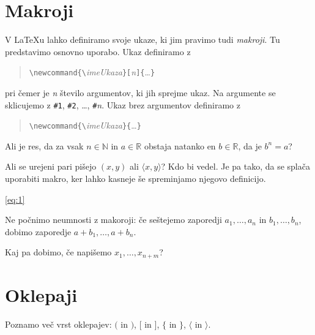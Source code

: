 \documentclass{amsart}
\begin{document}
\section{Makroji}
\label{sec:makroji}

V {\LaTeX}u lahko definiramo svoje ukaze, ki jim pravimo tudi \emph{makroji}. Tu
predstavimo osnovno uporabo. Ukaz definiramo z
%
\begin{quote}
  \verb|\newcommand{\|\emph{imeUkaza}\verb|}[|\emph{n}\verb|]{|\dots\verb|}|
\end{quote}
%
pri čemer je \emph{n} število argumentov, ki jih sprejme ukaz. Na argumente se sklicujemo
z \verb|#1|, \verb|#2|, \dots, \verb|#|\emph{n}. Ukaz brez argumentov definiramo z
%
\begin{quote}
  \verb|\newcommand{\|\emph{imeUkaza}\verb|}{|\dots\verb|}|
\end{quote}
%


\newcommand{\RR}{\mathbb{R}} %
\newcommand{\NN}{\mathbb{N}} %

Ali je res, da za vsak $n \in \NN$ in $a \in \RR$ obstaja natanko en $b \in \RR$, da je $b^n = a$?

\newcommand{\pair}[1]{\langle #1 \rangle}

Ali se urejeni pari pišejo $(x, y)$ ali $\pair{x, y}$? Kdo bi vedel. Je pa tako, da se
splača uporabiti makro, ker lahko kasneje še spreminjamo njegovo definicijo.

\newcommand{\zap}[2]{#1_1, \ldots, #1_{#2}} \ref{eq:1}

Ne počnimo neumnosti z makoroji: če seštejemo zaporedji $\zap{a}{n}$ in $\zap{b}{n}$,
dobimo zaporedje $\zap{a + b}{n}$.

Kaj pa dobimo, če napišemo $\zap{x}{n + m}$?

\section{Oklepaji}
\label{sec:oklepaji}

Poznamo več vrst oklepajev: $($ in $)$, $[$ in $]$, $\{$ in $\}$, $\langle$ in $\rangle$.
\end{document}
